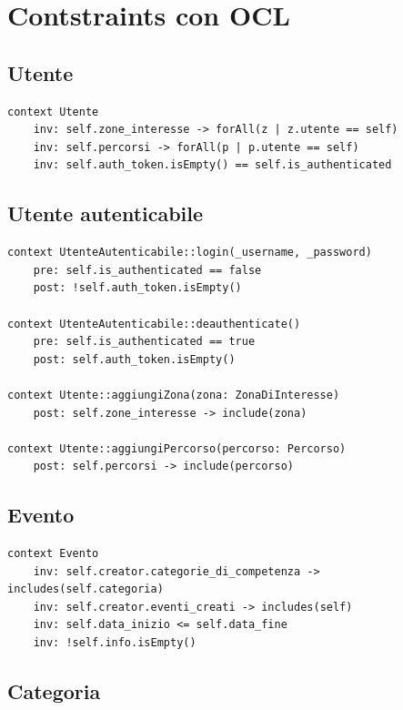 \documentclass{article}
\begin{document}
\section{Contstraints con OCL}

\subsection{Utente}

\begin{verbatim}
context Utente
    inv: self.zone_interesse -> forAll(z | z.utente == self)
    inv: self.percorsi -> forAll(p | p.utente == self)
    inv: self.auth_token.isEmpty() == self.is_authenticated
\end{verbatim}

\subsection{Utente autenticabile}

\begin{verbatim}
context UtenteAutenticabile::login(_username, _password)
    pre: self.is_authenticated == false
    post: !self.auth_token.isEmpty()

context UtenteAutenticabile::deauthenticate()
    pre: self.is_authenticated == true
    post: self.auth_token.isEmpty()

context Utente::aggiungiZona(zona: ZonaDiInteresse)
    post: self.zone_interesse -> include(zona)

context Utente::aggiungiPercorso(percorso: Percorso)
    post: self.percorsi -> include(percorso)
\end{verbatim}

\subsection{Evento}

\begin{verbatim}
context Evento
    inv: self.creator.categorie_di_competenza -> includes(self.categoria)
    inv: self.creator.eventi_creati -> includes(self)
    inv: self.data_inizio <= self.data_fine
    inv: !self.info.isEmpty()
\end{verbatim}

\subsection{Categoria}
\end{document}
